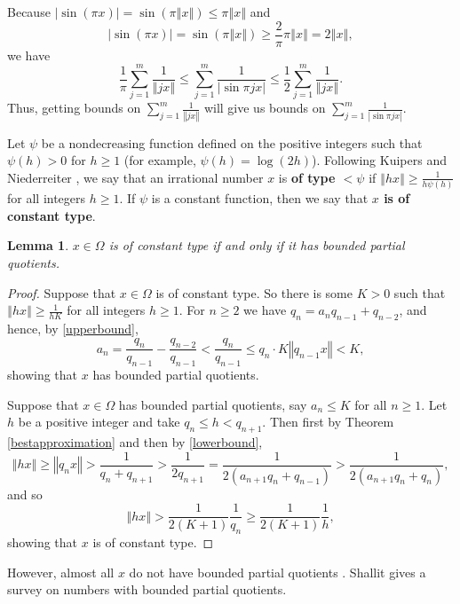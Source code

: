 \documentclass{article}
\newcommand{\norm}[1]{\left\Vert #1 \right\Vert}
\newtheorem{lemma}[theorem]{Lemma}
\begin{document}
Because $|\sin (\pi x)| = \sin(\pi \norm{x}) 
\leq \pi \norm{x}$ and
\[
|\sin (\pi x)| = \sin(\pi \norm{x}) \geq \frac{2}{\pi} \pi \norm{x}=2\norm{x},
\]
we have
\begin{equation}
\frac{1}{\pi} \sum_{j=1}^m \frac{1}{\norm{jx}} 
\leq \sum_{j=1}^m \frac{1}{|\sin \pi  j x |} 
\leq \frac{1}{2} \sum_{j=1}^m  \frac{1}{\norm{jx}} .
\label{sinebound}
\end{equation}
Thus, getting bounds on $\sum_{j=1}^m \frac{1}{\norm{jx}}$ will give us bounds on $\sum_{j=1}^m \frac{1}{|\sin \pi  j x|}$.

Let $\psi$ be a nondecreasing function defined on the positive integers such that $\psi(h)>0$ for $h  \geq 1$ (for example, $\psi(h)=\log(2h)$). Following Kuipers and Niederreiter \cite[p.~121, Definition 3.3]{kuipers}, we say that 
an irrational number $x$ is \textbf{of type $<\psi$} if $\norm{hx} \geq \frac{1}{h\psi(h)}$ for all  integers $h \geq 1$.
If $\psi$ is a constant function, then we say that
\textbf{$x$ is of constant type}.

\begin{lemma}
$x \in \Omega$ is of constant type if and only if it has bounded partial quotients.
\label{constanttype}
\end{lemma}
\begin{proof}
Suppose that $x \in \Omega$ is of constant type. So there is some $K>0$ such that $\norm{hx} \geq \frac{1}{hK}$ for all integers $h \geq 1$. For $n \geq 2$
we have $q_n=a_n q_{n-1}+q_{n-2}$, and hence, by \eqref{upperbound},
\[
a_n=\frac{q_n}{q_{n-1}}-\frac{q_{n-2}}{q_{n-1}}
<\frac{q_n}{q_{n-1}}
\leq q_n \cdot K\norm{q_{n-1}x}
< K,
\]
showing that $x$ has bounded partial quotients.

Suppose that $x \in \Omega$ has bounded partial quotients, say $a_n \leq K$ for all $n \geq 1$. Let $h$ be a positive integer and take $q_n \leq h
< q_{n+1}$. Then first by Theorem \ref{bestapproximation} and then by \eqref{lowerbound},
\[
\norm{hx} \geq \norm{q_n x} > \frac{1}{q_n+q_{n+1}} > \frac{1}{2q_{n+1}}
=\frac{1}{2(a_{n+1}q_n+q_{n-1})}
>\frac{1}{2(a_{n+1}q_n+q_n)},
\]
and so
\[
\norm{hx} > \frac{1}{2(K+1)} \frac{1}{q_n} \geq \frac{1}{2(K+1)}  \frac{1}{h},
\]
showing that $x$ is of constant type.
\end{proof}

However, almost all $x$ do not have bounded partial quotients \cite[p.~60, Theorem 29]{MR1451873}. Shallit \cite{MR1175525} gives a survey on numbers with bounded partial quotients.
\end{document}
